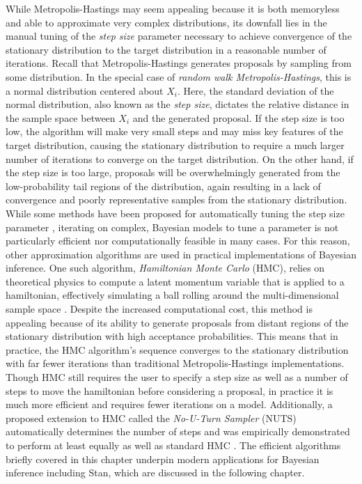 \documentclass[
  12pt,
  twoside]{book}
\theoremstyle{definition}
\theoremstyle{definition}
\theoremstyle{definition}
\theoremstyle{remark}
\begin{document}
While Metropolis-Hastings may seem appealing because it is both memoryless and able to approximate very complex distributions, its downfall lies in the manual tuning of the \emph{step size} parameter necessary to achieve convergence of the stationary distribution to the target distribution in a reasonable number of iterations.
Recall that Metropolis-Hastings generates proposals by sampling from some distribution.
In the special case of \emph{random walk Metropolis-Hastings}, this is a normal distribution centered about \(X_{i}\).
Here, the standard deviation of the normal distribution, also known as the \emph{step size}, dictates the relative distance in the sample space between \(X_{i}\) and the generated proposal.
If the step size is too low, the algorithm will make very small steps and may miss key features of the target distribution, causing the stationary distribution to require a much larger number of iterations to converge on the target distribution.
On the other hand, if the step size is too large, proposals will be overwhelmingly generated from the low-probability tail regions of the distribution, again resulting in a lack of convergence and poorly representative samples from the stationary distribution.
While some methods have been proposed for automatically tuning the step size parameter \citep{Graves2011}, iterating on complex, Bayesian models to tune a parameter is not particularly efficient nor computationally feasible in many cases.
For this reason, other approximation algorithms are used in practical implementations of Bayesian inference.
One such algorithm, \emph{Hamiltonian Monte Carlo} (HMC), relies on theoretical physics to compute a latent momentum variable that is applied to a hamiltonian, effectively simulating a ball rolling around the multi-dimensional sample space \citep{Brooks2011}.
Despite the increased computational cost, this method is appealing because of its ability to generate proposals from distant regions of the stationary distribution with high acceptance probabilities.
This means that in practice, the HMC algorithm's sequence converges to the stationary distribution with far fewer iterations than traditional Metropolis-Hastings implementations.
Though HMC still requires the user to specify a step size as well as a number of steps to move the hamiltonian before considering a proposal, in practice it is much more efficient and requires fewer iterations on a model.
Additionally, a proposed extension to HMC called the \emph{No-U-Turn Sampler} (NUTS) automatically determines the number of steps and was empirically demonstrated to perform at least equally as well as standard HMC \citep{Homan2014}.
The efficient algorithms briefly covered in this chapter underpin modern applications for Bayesian inference including Stan, which are discussed in the following chapter.
\end{document}
